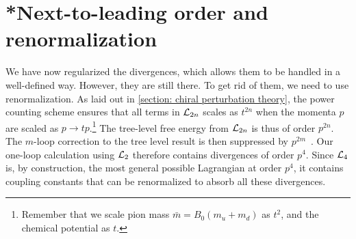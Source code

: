\section{*Next-to-leading order and renormalization}

We have now regularized the divergences, which allows them to be handled in a well-defined way.
However, they are still there.
To get rid of them, we need to use renormalization.
As laid out in \autoref{section: chiral perturbation theory}, the power counting scheme ensures that all terms in $\mathcal{L}_{2n}$ scales as $t^{2n}$ when the momenta $p$ are scaled as  $p \rightarrow t p$.\footnote{
    Remember that we scale pion mass $\bar m = B_0(m_u + m_d)$ as $t^2$, and the chemical potential as $t$.
    }
The tree-level free energy from $\mathcal{L}_{2n}$ is thus of order $p^{2n}$.
The $m$-loop correction to the tree level result is then suppressed by $p^{2m}$~\autocite{gasserChiralPerturbationTheory1984,weinbergPhenomenologicalLagrangians1979}.
Our one-loop calculation using $\mathcal{L}_2$ therefore contains divergences of order $p^{4}$. 
Since $\mathcal{L}_4$ is, by construction, the most general possible Lagrangian at order $p^4$, it contains coupling constants that can be renormalized to absorb all these divergences.

